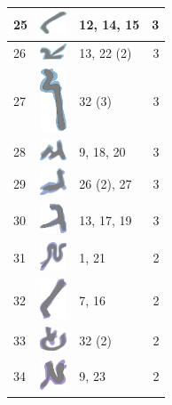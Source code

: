 \documentclass[final]{report}
\begin{document}
\begin{center}
\begin{longtable}{|p{0.5cm}|p{1.2cm}|p{11.89cm}|r|}
\hline
25 & \includegraphics[align=t,width=0.8cm]{0025} & 12, 14, 15 & 3 \\
\hline
26 & \includegraphics[align=t,width=0.8cm]{0026} & 13, 22 (2) & 3 \\
\hline
27 & \includegraphics[align=t,width=0.8cm]{0027} & 32 (3) & 3 \\
\hline
28 & \includegraphics[align=t,width=0.8cm]{0028} & 9, 18, 20 & 3 \\
\hline
29 & \includegraphics[align=t,width=0.8cm]{0029} & 26 (2), 27 & 3 \\
\hline
30 & \includegraphics[align=t,width=0.8cm]{0030} & 13, 17, 19 & 3 \\
\hline
31 & \includegraphics[align=t,width=0.8cm]{0031} & 1, 21 & 2 \\
\hline
32 & \includegraphics[align=t,width=0.8cm]{0032} & 7, 16 & 2 \\
\hline
33 & \includegraphics[align=t,width=0.8cm]{0033} & 32 (2) & 2 \\
\hline
34 & \includegraphics[align=t,width=0.8cm]{0034} & 9, 23 & 2 \\

\end{longtable}
\end{center}
\end{document}
